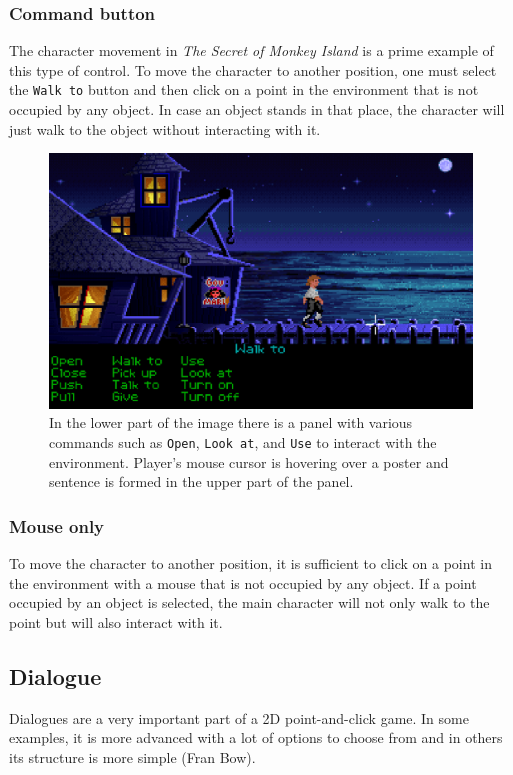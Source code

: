 \subsubsection{Command button}
The character movement in \textit{The Secret of Monkey Island} is a prime example of this type of control. To move the character to another position, one must select the \texttt{Walk to} button and then click on a point in the environment that is not occupied by any object. In case an object stands in that place, the character will just walk to the object without interacting with it.

\begin{figure}[H]
\centering
\includegraphics[width=.8\linewidth]{img/W-TSoMI.png}
\caption{In the lower part of the image there is a panel with various commands such as \texttt{Open}, \texttt{Look at}, and \texttt{Use} to interact with the environment. Player's mouse cursor is hovering over a poster and sentence is formed in the upper part of the panel.}
\label{fig:C-TSoMI}
\end{figure}

\subsubsection{Mouse only}
To move the character to another position, it is sufficient to click on a point in the environment with a mouse that is not occupied by any object. If a point occupied by an object is selected, the main character will not only walk to the point but will also interact with it.

\subsection{Dialogue}
Dialogues are a very important part of a 2D point-and-click game. In some examples, it is more advanced with a lot of options to choose from and in others its structure is more simple (Fran Bow).  

